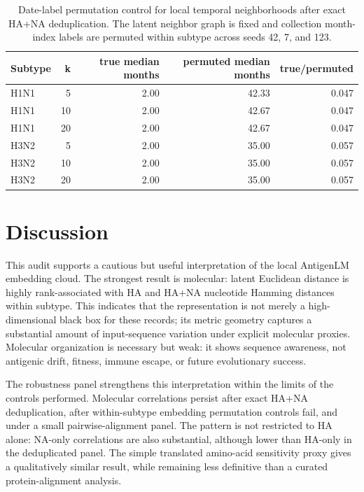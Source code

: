 \documentclass[11pt]{article}
\begin{document}
\begin{table}[H]
\centering
\caption{Date-label permutation control for local temporal neighborhoods after exact HA+NA deduplication. The latent neighbor graph is fixed and collection month-index labels are permuted within subtype across seeds 42, 7, and 123.}
\label{tab:temporal-permutation}
\begin{tabular}{lrrrr}
\toprule
Subtype & k & true median months & permuted median months & true/permuted \\
\midrule
H1N1 & 5 & 2.00 & 42.33 & 0.047 \\
H1N1 & 10 & 2.00 & 42.67 & 0.047 \\
H1N1 & 20 & 2.00 & 42.67 & 0.047 \\
H3N2 & 5 & 2.00 & 35.00 & 0.057 \\
H3N2 & 10 & 2.00 & 35.00 & 0.057 \\
H3N2 & 20 & 2.00 & 35.00 & 0.057 \\
\bottomrule
\end{tabular}
\end{table}

\section{Discussion}

This audit supports a cautious but useful interpretation of the local AntigenLM embedding cloud. The strongest result is molecular: latent Euclidean distance is highly rank-associated with HA and HA+NA nucleotide Hamming distances within subtype. This indicates that the representation is not merely a high-dimensional black box for these records; its metric geometry captures a substantial amount of input-sequence variation under explicit molecular proxies. Molecular organization is necessary but weak: it shows sequence awareness, not antigenic drift, fitness, immune escape, or future evolutionary success.

The robustness panel strengthens this interpretation within the limits of the controls performed. Molecular correlations persist after exact HA+NA deduplication, after within-subtype embedding permutation controls fail, and under a small pairwise-alignment panel. The pattern is not restricted to HA alone: NA-only correlations are also substantial, although lower than HA-only in the deduplicated panel. The simple translated amino-acid sensitivity proxy gives a qualitatively similar result, while remaining less definitive than a curated protein-alignment analysis.
\end{document}
